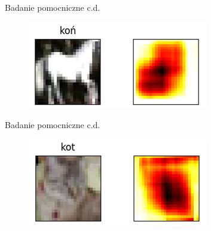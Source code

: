 \documentclass[xcolor=dvipsnames]{beamer}
\begin{document}
\begin{frame}{Badanie pomocniczne c.d.}
  \begin{figure}
    \includegraphics[width=\textwidth]{img/heatmap_3.png}
  \end{figure}
\end{frame}
\begin{frame}{Badanie pomocniczne c.d.}
  \begin{figure}
    \includegraphics[width=\textwidth]{img/heatmap_4.png}
  \end{figure}
\end{frame}
\end{document}
